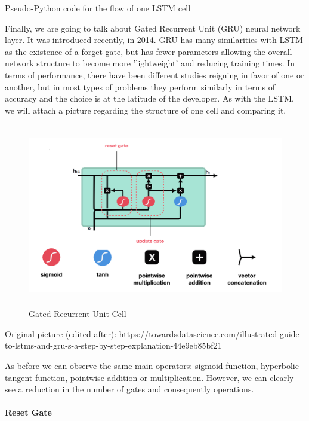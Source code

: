 \begin{algorithm}
\caption{Pseudo-Python code for the flow of one LSTM cell}
\label{lstmcellpseudocode}

\end{algorithm}

Finally, we are going to talk about Gated Recurrent Unit (GRU) neural network layer. It was introduced recently, in 2014. GRU has many similarities with LSTM as the existence of a forget gate, but has fewer parameters allowing the overall network structure to become more 'lightweight' and reducing training times. In terms of performance, there have been different studies reigning in favor of one or another, but in most types of problems they perform similarly in terms of accuracy and the choice is at the latitude of the developer. As with the LSTM, we will attach a picture regarding the structure of one cell and comparing it.

\begin{figure}[H]
\centering
\includegraphics[height=8cm]{images/GRUCell.png} 
\caption{Gated Recurrent Unit Cell}
\label{fig:grucell}
\end{figure}
\begin{flushright}
Original picture (edited after): https://towardsdatascience.com/illustrated-guide-to-lstms-and-gru-s-a-step-by-step-explanation-44e9eb85bf21
\end{flushright}


As before we can observe the same main operators: sigmoid function, hyperbolic tangent function, pointwise addition or multiplication. However, we can clearly see a reduction in the number of gates and consequently operations.

\paragraph{Reset Gate}\mbox{}

